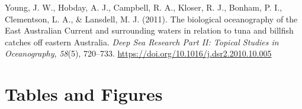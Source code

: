 \documentclass{article}
\newlength{\cslhangindent}
\newlength{\cslentryspacingunit} %
\newenvironment{CSLReferences}[2] %
 {%
  \setlength{\parindent}{0pt}
  \ifodd #1
  \let\oldpar\par
  \def\par{\hangindent=\cslhangindent\oldpar}
  \fi
  \setlength{\parskip}{#2\cslentryspacingunit}
 }%
 {}
\begin{document}
\begin{CSLReferences}{1}{0}
\leavevmode{}%
Young, J. W., Hobday, A. J., Campbell, R. A., Kloser, R. J., Bonham, P. I., Clementson, L. A., \& Lansdell, M. J. (2011). The biological oceanography of the East Australian Current and surrounding waters in relation to tuna and billfish catches off eastern Australia. \emph{Deep Sea Research Part II: Topical Studies in Oceanography}, \emph{58}(5), 720--733. \url{https://doi.org/10.1016/j.dsr2.2010.10.005}

\end{CSLReferences}

\newpage

\hypertarget{tables-and-figures}{%
\section*{Tables and Figures}\label{tables-and-figures}}
\end{document}

